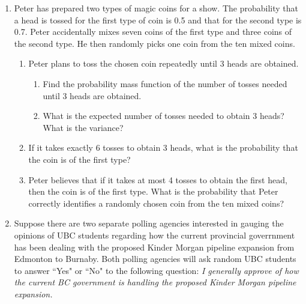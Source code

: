 \documentclass[11pt]{article}
\begin{document}
\begin{enumerate}[label=\textbf{Q \arabic*:},start=1]
\item
Peter has prepared two types of magic coins for a show. The probability that a head is tossed for the first type of coin is 0.5 and that for the second type is 0.7. Peter accidentally mixes seven coins of the first type and three coins of the second type. 
He then randomly picks one coin from the ten mixed coins.
\begin{enumerate}
  \item Peter plans to toss the chosen coin repeatedly until 3 heads are obtained.
  \begin{enumerate}
    \item Find the probability mass function of the number of tosses needed until 3 heads are obtained.\\



    \item What is the expected number of tosses needed to obtain 3 heads? What is the variance?\\

  \end{enumerate}

  \item If it takes exactly 6 tosses to obtain 3 heads, what is the probability that the coin is of the first type?\\



  \item Peter believes that if it takes at most 4 tosses to obtain the first head, then the coin is of the first type. What is the probability that Peter correctly identifies a randomly chosen coin from the ten mixed coins?\\

\end{enumerate}



\newpage


\item 
Suppose there are two separate polling agencies interested in gauging the opinions of UBC students regarding how the current provincial goverrnment has been dealing with the proposed Kinder Morgan pipeline expansion from Edmonton to Burnaby. Both polling agencies will ask random UBC students to answer ``Yes" or ``No" to the following question: {\em I generally approve of how the current BC government is handling the proposed Kinder Morgan pipeline expansion.}


\end{enumerate}
\end{document}
